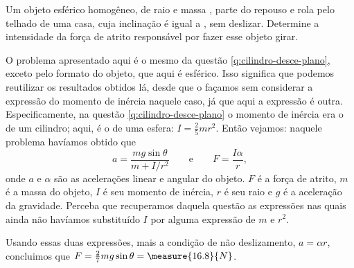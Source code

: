 \begin{question}
    Um objeto esférico homogêneo, de raio  e massa , parte do repouso e rola pelo telhado de uma casa, cuja inclinação é igual a , sem deslizar.
    Determine a intensidade da força de atrito responsável por fazer esse objeto girar.

    \begin{answer}
    \end{answer}
    
    \begin{solution}
      O problema apresentado aqui é o mesmo da questão \ref{q:cilindro-desce-plano}, exceto pelo formato do objeto, que aqui é esférico.
      Isso significa que podemos reutilizar os resultados obtidos lá, desde que o façamos sem considerar a expressão do momento de inércia naquele caso, já que aqui a expressão é outra.
      Especificamente, na questão \ref{q:cilindro-desce-plano} o momento de inércia era o de um cilindro; aqui, é o de uma esfera: $I = \frac{2}{5}mr^2$.
      Então vejamos: naquele problema havíamos obtido que
      \begin{equation*}
        a = \frac{mg\sin\theta}{m + I/r^2}
        \qquad\text{e}\qquad
        F = \frac{I\alpha}{r},
      \end{equation*}
      onde $a$ e $\alpha$ são as acelerações linear e angular do objeto.
      $F$ é a força de atrito, $m$ é a massa do objeto, $I$ é seu momento de inércia, $r$ é seu raio e $g$ é a aceleração da gravidade.
      Perceba que recuperamos daquela questão as expressões nas quais ainda não havíamos substituído $I$ por alguma expressão de $m$ e $r^2$.
      
      Usando essas duas expressões, mais a condição de não deslizamento, $a = \alpha r$, concluimos que $F = \frac{2}{7}mg\sin\theta = \measure{16.8}{N}$.
    \end{solution}
\end{question}